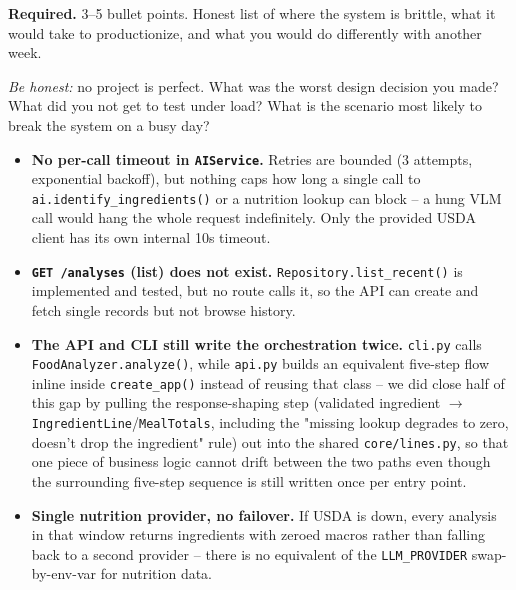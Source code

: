\documentclass[11pt,a4paper]{article}
\newenvironment{deliverbox}{\begin{deliverboxshown}}{\end{deliverboxshown}}
\newenvironment{probebox}{\begin{probeboxshown}}{\end{probeboxshown}}
\newenvironment{deliverbox}{\setbox0\vbox\bgroup}{\egroup\ignorespacesafterend}
\newenvironment{probebox}{\setbox0\vbox\bgroup}{\egroup\ignorespacesafterend}
\begin{document}
\begin{deliverbox}
\textbf{Required.} 3--5 bullet points. Honest list of where the system is brittle, what it would take to productionize, and what you would do differently with another week.
\end{deliverbox}

\begin{probebox}
\textit{Be honest:} no project is perfect. What was the worst design decision you made? What did you not get to test under load? What is the scenario most likely to break the system on a busy day?
\end{probebox}

\begin{itemize}[leftmargin=1.4em,itemsep=3pt]
  \item \textbf{No per-call timeout in \texttt{AIService}.} Retries are
  bounded (3 attempts, exponential backoff), but nothing caps how long a
  single call to \texttt{ai.identify\_ingredients()} or a nutrition lookup
  can block -- a hung VLM call would hang the whole request indefinitely.
  Only the provided USDA client has its own internal 10s timeout.
  \item \textbf{\texttt{GET /analyses} (list) does not exist.}
  \texttt{Repository.list\_recent()} is implemented and tested, but no
  route calls it, so the API can create and fetch single records but not
  browse history.
  \item \textbf{The API and CLI still write the orchestration twice.}
  \texttt{cli.py} calls \texttt{FoodAnalyzer.analyze()}, while
  \texttt{api.py} builds an equivalent five-step flow inline inside
  \texttt{create\_app()} instead of reusing that class -- we did close half
  of this gap by pulling the response-shaping step
  (validated ingredient $\to$ \texttt{IngredientLine}/\texttt{MealTotals},
  including the "missing lookup degrades to zero, doesn't drop the
  ingredient" rule) out into the shared \texttt{core/lines.py}, so that one
  piece of business logic cannot drift between the two paths even though
  the surrounding five-step sequence is still written once per entry point.
  \item \textbf{Single nutrition provider, no failover.} If USDA is down,
  every analysis in that window returns ingredients with zeroed macros
  rather than falling back to a second provider -- there is no equivalent
  of the \texttt{LLM\_PROVIDER} swap-by-env-var for nutrition data.
\end{itemize}
\end{document}
